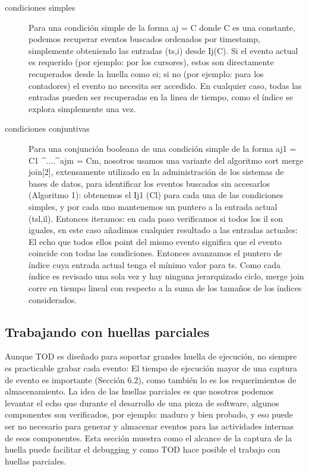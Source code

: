 \documentclass[12pt,a4paper]{report}
\begin{document}
\begin{description}
	\item[condiciones simples] Para una condición simple de la forma aj = C donde C es una constante, podemos recuperar eventos buscados ordenados por timestamp, simplemente obteniendo las entradas (ts,i) desde Ij(C).  Si el evento actual es requerido (por ejemplo: por los cursores), estos son directamente recuperados desde la huella como ei; si no (por ejemplo: para los contadores) el evento no necesita ser accedido.  En cualquier caso, todas las entradas pueden ser recuperadas en la linea de tiempo, como el índice se explora simplemente una vez.

	\item[condiciones conjuntivas] Para una conjunción booleana de una condición simple de la forma aj1 = C1 ^....^ajm = Cm, nosotros usamos una variante del algoritmo sort merge join[2], extensamente utilizado en la administración de los sistemas de bases de datos, para identificar los eventos buscados sin accesarlos (Algoritmo 1):  obtenemos el Ij1 (Cl) para cada una de las condiciones simples, y por cada uno mantenemos un puntero a la entrada actual (tsl,il).  Entonces iteramos: en cada paso verificamos si todos los il son iguales, en este caso añadimos cualquier resultado a las entradas actuales:  El echo que todos ellos point del mismo evento significa que el evento coincide con todas las condiciones.  Entonces avanzamos el puntero de índice cuya entrada actual tenga el mínimo valor para ts.  Como cada índice es revisado una sola vez y hay ninguna jerarquizado ciclo, merge join corre en tiempo lineal con respecto a la suma de los tamaños de los índices considerados.
\end{description}


		\subsection{Trabajando con huellas parciales}

	Aunque TOD es diseñado para soportar grandes huella de ejecución, no siempre es practicable grabar cada evento:  El tiempo de ejecución mayor de una captura de evento es importante (Sección 6.2), como también lo es los requerimientos de almacenamiento.  La idea de las huellas parciales es que nosotros podemos levantar el echo que durante el desarrollo de una pieza de software, algunos componentes son verificados, por ejemplo: maduro y bien probado, y eso puede ser no necesario para generar y almacenar eventos para las actividades internas de esos componentes.  Esta sección muestra como el alcance de la captura de la huella puede facilitar el debugging y como TOD hace posible el trabajo con huellas parciales.
\end{document}
